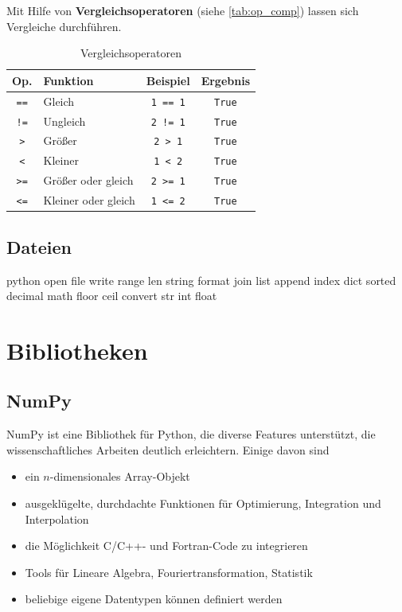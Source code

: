 Mit Hilfe von \textbf{Vergleichsoperatoren} (siehe \autoref{tab:op_comp}) lassen sich Vergleiche durchführen.
\begin{table}[H]
  \centering{}
  \caption{Vergleichsoperatoren}
  \label{tab:op_comp}
  \begin{tabular}{c l c c}
    \toprule
    Op.             & Funktion            & Beispiel        & Ergebnis \\
    \midrule
    \texttt{==}     & Gleich              & \texttt{1 == 1} & \texttt{True} \\
    \texttt{!=}     & Ungleich            & \texttt{2 != 1} & \texttt{True} \\
    \texttt{>}      & Größer              & \texttt{2 > 1}  & \texttt{True} \\
    \texttt{<}      & Kleiner             & \texttt{1 < 2}  & \texttt{True} \\
    \texttt{>=}     & Größer oder gleich  & \texttt{2 >= 1} & \texttt{True} \\
    \texttt{<=}     & Kleiner oder gleich & \texttt{1 <= 2} & \texttt{True} \\
    \bottomrule
  \end{tabular}
\end{table}

\subsection{Dateien}
 
python
    open
    file
        write
    range
    len
    string
        format
        join
    list
        append
        index
    dict
    sorted
    decimal
    math
        floor
        ceil
    convert
        str
        int
        float

\section{Bibliotheken}
\subsection{NumPy}
NumPy ist eine Bibliothek für Python, die diverse Features unterstützt, die wissenschaftliches Arbeiten deutlich erleichtern.
Einige davon sind
\begin{itemize}
  \item ein $n$-dimensionales Array-Objekt
  \item ausgeklügelte, durchdachte Funktionen für Optimierung, Integration und Interpolation
  \item die Möglichkeit C/C++- und Fortran-Code zu integrieren
  \item Tools für Lineare Algebra, Fouriertransformation, Statistik
  \item beliebige eigene Datentypen können definiert werden
\end{itemize}

